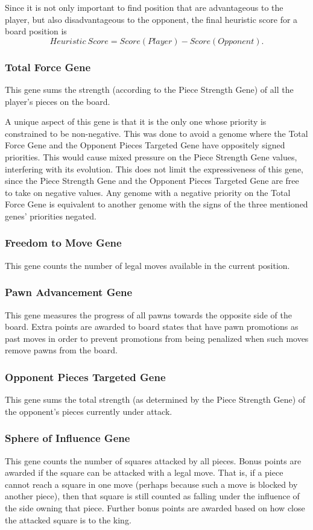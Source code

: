 \documentclass[letterpaper]{article}
\renewcommand{\_}{\allowbreak\textunderscore\allowbreak}
\begin{document}
Since it is not only important to find position that are advantageous to the player, but also disadvantageous to the opponent, the final heuristic score for a board position is
\[Heuristic\ Score = Score(Player) - Score(Opponent).\]

\subsubsection{Total Force Gene}
\label{total-force}
This gene sums the strength (according to the Piece Strength Gene) of all the player's pieces on the board.

A unique aspect of this gene is that it is the only one whose priority is constrained to be non-negative. This was done to avoid a genome where the Total Force Gene and the Opponent Pieces Targeted Gene have oppositely signed priorities. This would cause mixed pressure on the Piece Strength Gene values, interfering with its evolution. This does not limit the expressiveness of this gene, since the Piece Strength Gene and the Opponent Pieces Targeted Gene are free to take on negative values. Any genome with a negative priority on the Total Force Gene is equivalent to another genome with the signs of the three mentioned genes' priorities negated.

\subsubsection{Freedom to Move Gene}
This gene counts the number of legal moves available in the current position.

\subsubsection{Pawn Advancement Gene}
This gene measures the progress of all pawns towards the opposite side of the board. Extra points are awarded to board states that have pawn promotions as past moves in order to prevent promotions from being penalized when such moves remove pawns from the board.

\subsubsection{Opponent Pieces Targeted Gene}
This gene sums the total strength (as determined by the Piece Strength Gene) of the opponent's pieces currently under attack.

\subsubsection{Sphere of Influence Gene}
This gene counts the number of squares attacked by all pieces. Bonus points are awarded if the square can be attacked with a legal move. That is, if a piece cannot reach a square in one move (perhaps because such a move is blocked by another piece), then that square is still counted as falling under the influence of the side owning that piece. Further bonus points are awarded based on how close the attacked square is to the king.
\end{document}
